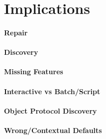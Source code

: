 \section{Implications}

\paragraph{\bf Repair}

\TODO

\paragraph{\bf Discovery}

\TODO

\paragraph{\bf Missing Features}

\TODO

\paragraph{\bf Interactive vs Batch/Script}

\TODO

\paragraph{\bf Object Protocol Discovery}

\TODO

\paragraph{\bf Wrong/Contextual Defaults}

\TODO
